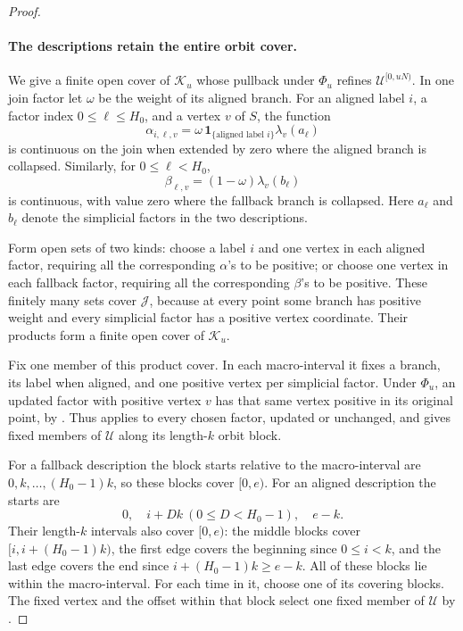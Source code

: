 \begin{proof}
\paragraph{The descriptions retain the entire orbit cover.}
We give a finite open cover of $\mathcal K_u$ whose pullback
under $\Phi_u$ refines $\mathcal U^{[0,uN)}$.
In one join factor let $\omega$ be the weight of its aligned
branch.  For an aligned label $i$, a factor index
$0\le\ell\le H_0$, and a vertex $v$ of $S$, the function
\[
 \alpha_{i,\ell,v}
   =\omega\,\mathbf 1_{\{\text{aligned label }i\}}
       \lambda_v(a_\ell)
\]
is continuous on the join when extended by zero where the
aligned branch is collapsed.  Similarly, for $0\le\ell<H_0$,
\[
 \beta_{\ell,v}=(1-\omega)\lambda_v(b_\ell)
\]
is continuous, with value zero where the fallback branch is
collapsed.  Here $a_\ell$ and $b_\ell$ denote the simplicial
factors in the two descriptions.

Form open sets of two kinds: choose a label $i$ and one vertex
in each aligned factor, requiring all the corresponding
$\alpha$'s to be positive; or choose one vertex in each fallback
factor, requiring all the corresponding $\beta$'s to be
positive.  These finitely many sets cover $\mathcal J$, because
at every point some branch has positive weight and every
simplicial factor has a positive vertex coordinate.  Their
products form a finite open cover of $\mathcal K_u$.

Fix one member of this product cover.  In each macro-interval
it fixes a branch, its label when aligned, and one positive
vertex per simplicial factor.  Under $\Phi_u$, an updated
factor with positive vertex $v$ has that same vertex positive
in its original point, by .
Thus  applies to every
chosen factor, updated or unchanged, and gives fixed members
of $\mathcal U$ along its length-$k$ orbit block.

For a fallback description the block starts relative to the
macro-interval are $0,k,\ldots,(H_0-1)k$, so these blocks cover
$[0,e)$.  For an aligned description the starts are
\[
 0,\quad i+Dk\ (0\le D<H_0-1),\quad e-k.
\]
Their length-$k$ intervals also cover $[0,e)$: the middle
blocks cover $[i,i+(H_0-1)k)$, the first edge covers the
beginning since $0\le i<k$, and the last edge covers the end
since $i+(H_0-1)k\ge e-k$.  All of these blocks lie within the
macro-interval.  For each time in it, choose one of its covering
blocks.  The fixed vertex and the offset within that block
select one fixed member of $\mathcal U$ by
.


\end{proof}
